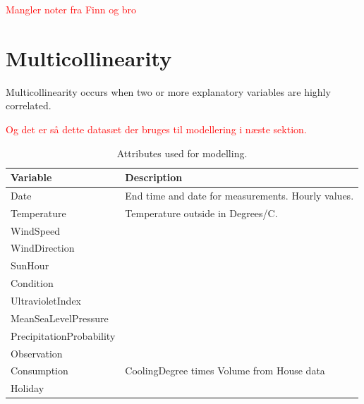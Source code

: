 \textcolor{red}{Mangler noter fra Finn og bro}


\section{Multicollinearity}
Multicollinearity occurs when two or more explanatory variables are highly correlated. 


\textcolor{red}{Og det er så dette datasæt der bruges til modellering i næste sektion.}
\begin{table}[H]
    \centering
    \begin{tabular}{ll}
     \hline
     \textbf{Variable} & \textbf{Description} \\
    \hline
    \hline
    Date  &  End time and date for measurements. Hourly values.\\
    Temperature  &  Temperature outside in Degrees/C. \\
    WindSpeed  &  \\
    WindDirection  &  \\
    SunHour  &  \\
    Condition  & \\
    UltravioletIndex  &   \\
    MeanSeaLevelPressure  & \\
    PrecipitationProbability & \\
    Observation & \\
    Consumption & CoolingDegree times Volume from House data \\
    Holiday & \\
    \hline
    \end{tabular}
    \caption{Attributes used for modelling.}
    \label{tab: modeldata}
\end{table}   